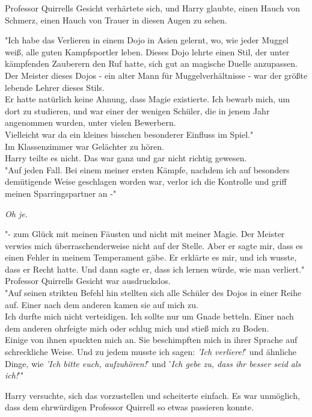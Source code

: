{Professor Quirrells Gesicht verhärtete sich, und Harry glaubte, einen Hauch von Schmerz, einen Hauch von Trauer in diesen Augen zu sehen.

"Ich habe das Verlieren in einem Dojo in Asien gelernt, wo, wie jeder Muggel weiß, alle guten Kampfsportler leben. Dieses Dojo lehrte einen Stil, der unter kämpfenden Zauberern den Ruf hatte, sich gut an magische Duelle anzupassen.\\ Der Meister dieses Dojos - ein alter Mann für Muggelverhältnisse - war der größte lebende Lehrer dieses Stils.\\ Er hatte natürlich keine Ahnung, dass Magie existierte. Ich bewarb mich, um dort zu studieren, und war einer der wenigen Schüler, die in jenem Jahr angenommen wurden, unter vielen Bewerbern.\\ Vielleicht war da ein kleines bisschen besonderer Einfluss im Spiel."\\ Im Klassenzimmer war Gelächter zu hören.\\ Harry teilte es nicht. Das war ganz und gar nicht richtig gewesen.\\ "Auf jeden Fall. Bei einem meiner ersten Kämpfe, nachdem ich auf besonders demütigende Weise geschlagen worden war, verlor ich die Kontrolle und griff meinen Sparringspartner an -"

\emph{Oh je.}

"- zum Glück mit meinen Fäusten und nicht mit meiner Magie. Der Meister verwies mich überraschenderweise nicht auf der Stelle. Aber er sagte mir, dass es einen Fehler in meinem Temperament gäbe. Er erklärte es mir, und ich wusste, dass er Recht hatte. Und dann sagte er, dass ich lernen würde, wie man verliert."\\ Professor Quirrells Gesicht war ausdruckslos.\\ "Auf seinen strikten Befehl hin stellten sich alle Schüler des Dojos in einer Reihe auf. Einer nach dem anderen kamen sie auf mich zu.\\ Ich durfte mich nicht verteidigen. Ich sollte nur um Gnade betteln. Einer nach dem anderen ohrfeigte mich oder schlug mich und stieß mich zu Boden.\\ Einige von ihnen spuckten mich an. Sie beschimpften mich in ihrer Sprache auf schreckliche Weise. Und zu jedem musste ich sagen: \emph{'Ich verliere!}' und ähnliche Dinge, wie \emph{'Ich bitte euch, aufzuhören!}' und '\emph{Ich gebe zu, dass ihr besser seid als ich!}'"

Harry versuchte, sich das vorzustellen und scheiterte einfach. Es war unmöglich, dass dem ehrwürdigen Professor Quirrell so etwas passieren konnte.

}
